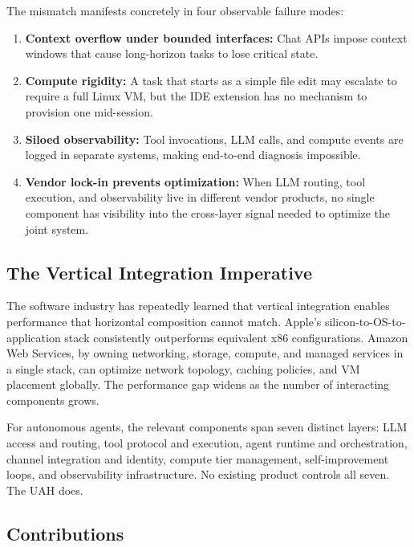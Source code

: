 The mismatch manifests concretely in four observable failure modes:

\begin{enumerate}[leftmargin=1.5em]
    \item \textbf{Context overflow under bounded interfaces:} Chat APIs impose
          context windows that cause long-horizon tasks to lose critical state.
    \item \textbf{Compute rigidity:} A task that starts as a simple file edit
          may escalate to require a full Linux VM, but the IDE extension has no
          mechanism to provision one mid-session.
    \item \textbf{Siloed observability:} Tool invocations, LLM calls, and
          compute events are logged in separate systems, making end-to-end
          diagnosis impossible.
    \item \textbf{Vendor lock-in prevents optimization:} When LLM routing,
          tool execution, and observability live in different vendor products,
          no single component has visibility into the cross-layer signal needed
          to optimize the joint system.
\end{enumerate}

\subsection{The Vertical Integration Imperative}

The software industry has repeatedly learned that vertical integration enables
performance that horizontal composition cannot match. Apple's silicon-to-OS-to-
application stack consistently outperforms equivalent x86 configurations.
Amazon Web Services, by owning networking, storage, compute, and managed
services in a single stack, can optimize network topology, caching policies, and
VM placement globally. The performance gap widens as the number of interacting
components grows.

For autonomous agents, the relevant components span seven distinct layers:
LLM access and routing, tool protocol and execution, agent runtime and
orchestration, channel integration and identity, compute tier management,
self-improvement loops, and observability infrastructure. No existing product
controls all seven. The UAH does.

\subsection{Contributions}

